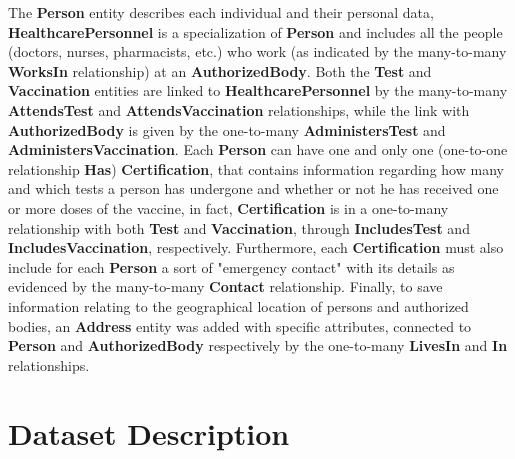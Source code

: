 \documentclass[a4paper,12pt]{article}
\begin{document}
The \textbf{Person} entity describes each individual and their personal data, \textbf{HealthcarePersonnel} is a specialization of \textbf{Person} and includes all the people (doctors, nurses, pharmacists, etc.) who work (as indicated by the many-to-many \textbf{WorksIn} relationship) at an \textbf{AuthorizedBody}. Both the \textbf{Test} and \textbf{Vaccination} entities are linked to \textbf{HealthcarePersonnel} by the many-to-many \textbf{AttendsTest} and \textbf{AttendsVaccination} relationships, while the link with \textbf{AuthorizedBody} is given by the one-to-many \textbf{AdministersTest} and \textbf{AdministersVaccination}. Each \textbf{Person} can have one and only one (one-to-one relationship \textbf{Has}) \textbf{Certification}, that contains information regarding how many and which tests a person has undergone and whether or not he has received one or more doses of the vaccine, in fact, \textbf{Certification} is in a one-to-many relationship with both \textbf{Test} and \textbf{Vaccination}, through \textbf{IncludesTest} and \textbf{IncludesVaccination}, respectively. Furthermore, each \textbf{Certification} must also include for each \textbf{Person} a sort of "emergency contact" with its details as evidenced by the many-to-many \textbf{Contact} relationship. Finally, to save information relating to the geographical location of persons and authorized bodies, an \textbf{Address} entity was added with specific attributes, connected to \textbf{Person} and \textbf{AuthorizedBody} respectively by the one-to-many \textbf{LivesIn} and \textbf{In} relationships.
\section{Dataset Description}
\end{document}
